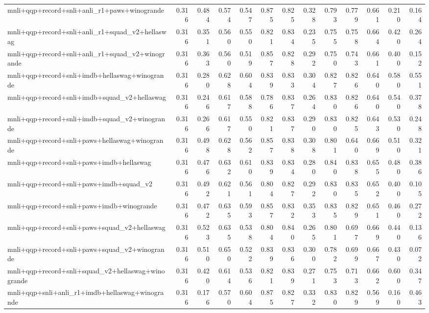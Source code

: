 \begin{table}[t]
\begin{tabular}{lrrrrrrrrrrrr}
    mnli+qqp+record+snli+anli\_r1+paws+winogrande & 0.316 & 0.484 & 0.574 & 0.547 & 0.875 & 0.825 & 0.328 & 0.793 & 0.779 & 0.661 & 0.210 & 0.164 \\
    mnli+qqp+record+snli+anli\_r1+squad\_v2+hellaswag & 0.316 & 0.351 & 0.560 & 0.550 & 0.821 & 0.834 & 0.235 & 0.755 & 0.758 & 0.664 & 0.420 & 0.264 \\
    mnli+qqp+record+snli+anli\_r1+squad\_v2+winogrande & 0.316 & 0.363 & 0.560 & 0.519 & 0.857 & 0.828 & 0.292 & 0.750 & 0.743 & 0.661 & 0.400 & 0.152 \\
    mnli+qqp+record+snli+imdb+hellaswag+winogrande & 0.316 & 0.280 & 0.628 & 0.604 & 0.839 & 0.833 & 0.304 & 0.827 & 0.826 & 0.640 & 0.580 & 0.551 \\
    mnli+qqp+record+snli+imdb+squad\_v2+hellaswag & 0.316 & 0.246 & 0.617 & 0.588 & 0.786 & 0.837 & 0.264 & 0.830 & 0.826 & 0.640 & 0.540 & 0.378 \\
    mnli+qqp+record+snli+imdb+squad\_v2+winogrande & 0.316 & 0.266 & 0.617 & 0.550 & 0.821 & 0.837 & 0.290 & 0.830 & 0.825 & 0.643 & 0.530 & 0.248 \\
    mnli+qqp+record+snli+paws+hellaswag+winogrande & 0.316 & 0.498 & 0.628 & 0.562 & 0.857 & 0.838 & 0.308 & 0.801 & 0.640 & 0.669 & 0.510 & 0.321 \\
    mnli+qqp+record+snli+paws+imdb+hellaswag & 0.316 & 0.476 & 0.632 & 0.610 & 0.839 & 0.834 & 0.280 & 0.840 & 0.838 & 0.655 & 0.480 & 0.386 \\
    mnli+qqp+record+snli+paws+imdb+squad\_v2 & 0.316 & 0.492 & 0.621 & 0.561 & 0.804 & 0.827 & 0.292 & 0.830 & 0.835 & 0.652 & 0.400 & 0.105 \\
    mnli+qqp+record+snli+paws+imdb+winogrande & 0.316 & 0.472 & 0.635 & 0.593 & 0.857 & 0.832 & 0.353 & 0.835 & 0.829 & 0.651 & 0.460 & 0.272 \\
    mnli+qqp+record+snli+paws+squad\_v2+hellaswag & 0.316 & 0.523 & 0.635 & 0.538 & 0.804 & 0.840 & 0.265 & 0.801 & 0.697 & 0.669 & 0.440 & 0.136 \\
    mnli+qqp+record+snli+paws+squad\_v2+winogrande & 0.316 & 0.510 & 0.650 & 0.522 & 0.839 & 0.836 & 0.300 & 0.782 & 0.699 & 0.667 & 0.430 & 0.072 \\
    mnli+qqp+record+snli+squad\_v2+hellaswag+winogrande & 0.316 & 0.420 & 0.614 & 0.536 & 0.821 & 0.839 & 0.271 & 0.753 & 0.713 & 0.662 & 0.600 & 0.347 \\
    mnli+qqp+snli+anli\_r1+imdb+hellaswag+winogrande & 0.316 & 0.176 & 0.570 & 0.604 & 0.875 & 0.827 & 0.332 & 0.830 & 0.829 & 0.569 & 0.160 & 0.463 \\

\end{tabular}
\end{table}
